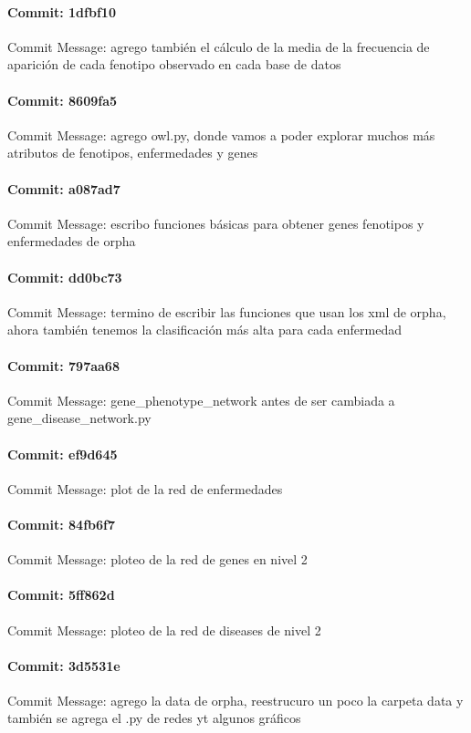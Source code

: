 \documentclass{article}
\begin{document}
\paragraph{Commit: 1dfbf10}
Commit Message: agrego también el cálculo de la media de la frecuencia de aparición de cada fenotipo observado en cada base de datos

\paragraph{Commit: 8609fa5}
Commit Message: agrego owl.py, donde vamos a poder explorar muchos más atributos de fenotipos, enfermedades y genes

\paragraph{Commit: a087ad7}
Commit Message: escribo funciones básicas para obtener genes fenotipos y enfermedades de orpha

\paragraph{Commit: dd0bc73}
Commit Message: termino de escribir las funciones que usan los xml de orpha, ahora también tenemos la clasificación más alta para cada enfermedad

\paragraph{Commit: 797aa68}
Commit Message: gene_phenotype_network antes de ser cambiada a gene_disease_network.py

\paragraph{Commit: ef9d645}
Commit Message: plot de la red de enfermedades

\paragraph{Commit: 84fb6f7}
Commit Message: ploteo de la red de genes en nivel 2

\paragraph{Commit: 5ff862d}
Commit Message: ploteo de la red de diseases de nivel 2

\paragraph{Commit: 3d5531e}
Commit Message: agrego la data de orpha, reestrucuro un poco la carpeta data y también se agrega el .py de redes yt algunos gráficos
\end{document}
